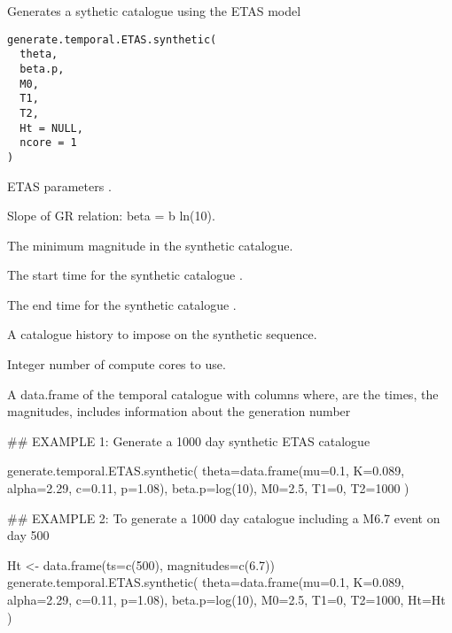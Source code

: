 \documentclass[letterpaper]{book}
\begin{document}
%
\begin{Arguments}
\begin{ldescription}
\item[\code{b}] 
\end{ldescription}
\end{Arguments}
%
\begin{Description}\relax
Generates a sythetic catalogue using the ETAS model
\end{Description}
%
\begin{Usage}
\begin{verbatim}
generate.temporal.ETAS.synthetic(
  theta,
  beta.p,
  M0,
  T1,
  T2,
  Ht = NULL,
  ncore = 1
)
\end{verbatim}
\end{Usage}
%
\begin{Arguments}
\begin{ldescription}
\item[\code{theta}] ETAS parameters .

\item[\code{beta.p}] Slope of GR relation: beta = b ln(10).

\item[\code{M0}] The minimum magnitude in the synthetic catalogue.

\item[\code{T1}] The start time for the synthetic catalogue .

\item[\code{T2}] The end time for the synthetic catalogue .

\item[\code{Ht}] A catalogue history to impose on the synthetic sequence.

\item[\code{ncore}] Integer number of compute cores to use.
\end{ldescription}
\end{Arguments}
%
\begin{Value}
A data.frame of the temporal catalogue with columns \AsIs{\texttt{[t\_i, M\_i, gen\_i]}}
where,  are the times,   the magnitudes,  includes information about the generation number
\end{Value}
%
\begin{Examples}
\begin{ExampleCode}
## EXAMPLE 1: Generate a 1000 day synthetic ETAS catalogue

generate.temporal.ETAS.synthetic( theta=data.frame(mu=0.1, K=0.089, alpha=2.29, c=0.11, p=1.08), beta.p=log(10), M0=2.5, T1=0, T2=1000 )


## EXAMPLE 2: To generate a 1000 day catalogue including a M6.7 event on day 500

Ht <- data.frame(ts=c(500), magnitudes=c(6.7))
generate.temporal.ETAS.synthetic( theta=data.frame(mu=0.1, K=0.089, alpha=2.29, c=0.11, p=1.08), beta.p=log(10), M0=2.5, T1=0, T2=1000, Ht=Ht )
\end{ExampleCode}
\end{Examples}
\end{document}
